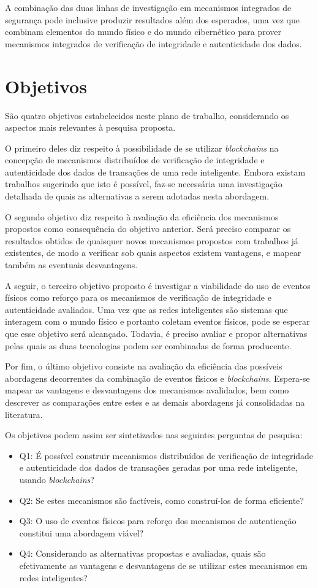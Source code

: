 \documentclass[12pt]{article}
\begin{document}
A combinação das duas linhas de investigação em mecanismos integrados de segurança pode inclusive produzir resultados além dos esperados, uma vez que combinam elementos do mundo físico e do mundo cibernético para prover mecanismos integrados de verificação de integridade e autenticidade dos dados.
    
\section{Objetivos}
São quatro objetivos estabelecidos neste plano de trabalho, considerando os aspectos mais relevantes à pesquisa proposta.

O primeiro deles diz respeito à possibilidade de se utilizar \textit{blockchains} na concepção de mecanismos distribuídos de verificação de integridade e autenticidade dos dados de transações de uma rede inteligente. Embora existam trabalhos sugerindo que isto é possível, faz-se necessária uma investigação detalhada de quais as alternativas a serem adotadas nesta abordagem.

O segundo objetivo diz respeito à avaliação da eficiência dos mecanismos propostos como consequência do objetivo anterior. Será preciso comparar os resultados obtidos de quaisquer novos mecanismos propostos com trabalhos já existentes, de modo a verificar sob quais aspectos existem vantagens, e mapear também as eventuais desvantagens.

A seguir, o terceiro objetivo proposto é investigar a viabilidade do uso de eventos físicos como reforço para os mecanismos de verificação de integridade e autenticidade avaliados. Uma vez que as redes inteligentes são sistemas que interagem com o mundo físico e portanto coletam eventos físicos, pode se esperar que esse objetivo será alcançado. Todavia, é preciso avaliar e propor alternativas pelas quais as duas tecnologias podem ser combinadas de forma producente.

Por fim, o último objetivo consiste na avaliação da eficiência das possíveis abordagens decorrentes da combinação de eventos físicos e \textit{blockchains}. Espera-se mapear as vantagens e desvantagens dos mecanismos avalidados, bem como descrever as comparações entre estes e as demais abordagens já consolidadas na literatura.

Os objetivos podem assim ser sintetizados nas seguintes perguntas de pesquisa:
\begin{itemize}
\item Q1: É possível construir mecanismos distribuídos de verificação de integridade e autenticidade dos dados de transações geradas por uma rede inteligente, usando \textit{blockchains}?
\item Q2: Se estes mecanismos são factíveis, como construí-los de forma eficiente?
\item Q3: O uso de eventos físicos para reforço dos mecanismos de autenticação constitui uma abordagem viável?
\item Q4: Considerando as alternativas propostas e avaliadas, quais são efetivamente as vantagens e desvantagens de se utilizar estes mecanismos em redes inteligentes?
\end{itemize}
\end{document}
